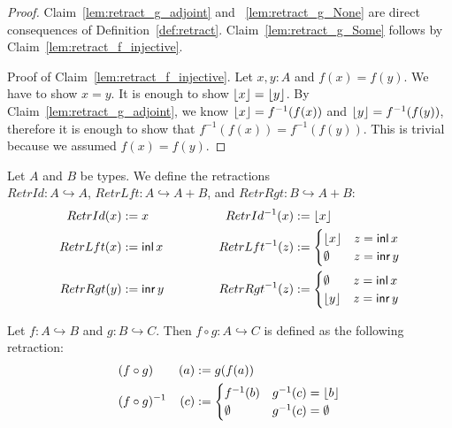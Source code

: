 \begin{proof}
  Claim~\ref{lem:retract_g_adjoint} and ~\ref{lem:retract_g_None} are direct consequences of Definition~\ref{def:retract}.
  Claim~\ref{lem:retract_g_Some} follows by Claim~\ref{lem:retract_f_injective}.

  Proof of Claim~\ref{lem:retract_f_injective}.  Let $x, y: A$ and $f(x)=f(y)$.  We have to show $x=y$.  It is enough to show $\left\lfloor {x} \right\rfloor = \left\lfloor {y} \right\rfloor$.  By
  Claim~\ref{lem:retract_g_adjoint}, we know $\left\lfloor {x} \right\rfloor = f^{-1}(f(x))$ and $\left\lfloor {y} \right\rfloor = f^{-1}(f(y))$, therefore it is enough to show that
  $f^{-1}(f(x)) = f^{-1}(f(y))$.  This is trivial because we assumed $f(x)=f(y)$.
\end{proof}

\begin{definition}
  \label{def:retracts-basic}
  Let $A$ and $B$ be types.  We define the retractions\\
  $RetrId : A \hookrightarrow A$, $RetrLft : A \hookrightarrow A+B$, and $RetrRgt : B \hookrightarrow A+B$:
  \begin{alignat*}{2}
    RetrId(x)  &:= x      &\qquad\qquad RetrId ^{-1} (x) &:= \left\lfloor {x} \right\rfloor \\
    RetrLft(x) &:= \operatorname{\mathsf{inl}} x &             RetrLft^{-1} (z) &:=
    \begin{cases}
      \left\lfloor {x} \right\rfloor & z = \operatorname{\mathsf{inl}} x \\
      \emptyset   & z = \operatorname{\mathsf{inr}} y
    \end{cases} \\
    RetrRgt(y) &:= \operatorname{\mathsf{inr}} y & RetrRgt^{-1} (z) &:=
    \begin{cases}
      \emptyset   & z = \operatorname{\mathsf{inl}} x \\
      \left\lfloor {y} \right\rfloor & z = \operatorname{\mathsf{inr}} y
    \end{cases}
  \end{alignat*}
\end{definition}

\begin{definition}
  \label{def:retract-compose}
  Let $f : A \hookrightarrow B$ and $g : B \hookrightarrow C$.  Then $f \circ g : A \hookrightarrow C$ is defined as the following retraction:
  \begin{alignat*}{2}
    & (f \circ g)      & (a) &:= g(f(a)) \\
    & (f \circ g)^{-1} & (c) &:=
    \begin{cases}
      f^{-1}(b) & g^{-1}(c) = \left\lfloor {b} \right\rfloor \\
      \emptyset & g^{-1}(c) = \emptyset
    \end{cases}
  \end{alignat*}
\end{definition}



